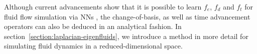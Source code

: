 Although current advancements show that it is possible to learn $f_e$, $f_d$ and
$f_t$ for fluid flow simulation via NNs \cite{LatentSpaceSubdivision,
Wiewel2019LatentSP}, the change-of-basis, as well as time advancement operators
can also be deduced in an analytical fashion. In
section~\ref{section:laplacian-eigenfluids}, we introduce a method in more
detail for simulating fluid dynamics in a reduced-dimensional space. 

